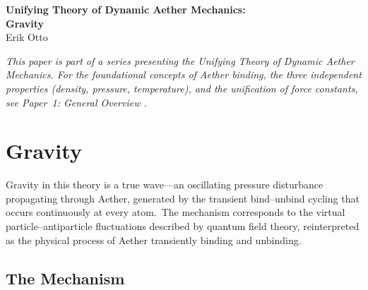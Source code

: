 ﻿\documentclass[12pt,letterpaper]{article}
\begin{document}
\begin{center}
{\LARGE\bfseries Unifying Theory of Dynamic Aether Mechanics:\\
Gravity}\\[1em]
{\large Erik Otto}
\end{center}

\vspace{1em}

\begin{abstract}
Within the Dynamic Aether Mechanics framework, gravity arises as the residual
asymmetry of a transient binding cycle in which virtual particle--antiparticle pairs
form and annihilate continuously at every atom.  This paper develops the gravitational
mechanism, derives the gravitational constant $G$ from binding physics, and resolves
the vacuum catastrophe.  The framework is extended to gravitomagnetism (frame dragging,
confirmed by Gravity Probe~B), gravitational lensing (deriving the full
general-relativistic bending angle $4GM/(r_0 c^2)$ from two independent mechanisms),
and Cherenkov radiation.  Connections to mass--energy equivalence and the self-limiting
behavior of gravity are established.
\end{abstract}

\vspace{1em}

\bigskip
\noindent\textit{This paper is part of a series presenting the Unifying Theory of
Dynamic Aether Mechanics.  For the foundational concepts of Aether binding,
the three independent properties (density, pressure, temperature), and the
unification of force constants, see Paper~1: General Overview \cite{otto-overview}.}
\bigskip

\section{Gravity}
\label{sec:gravity}

Gravity in this theory is a true wave---an oscillating pressure disturbance propagating
through Aether, generated by the transient bind--unbind cycling that occurs continuously
at every atom.\ The mechanism corresponds to the virtual particle--antiparticle fluctuations
described by quantum field theory, reinterpreted as the physical process of Aether
transiently binding and unbinding.


\subsection{The Mechanism}
\end{document}
